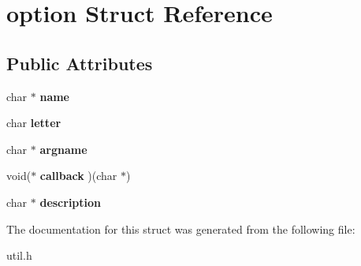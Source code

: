 \hypertarget{structoption}{\section{option Struct Reference}
\label{structoption}
}
\subsection*{Public Attributes}
\begin{DoxyCompactItemize}
\item 
\hypertarget{structoption_a92c850a23c7828c1dba453bf8d15e1f0}{char $\ast$ {\bfseries name}}\label{structoption_a92c850a23c7828c1dba453bf8d15e1f0}

\item 
\hypertarget{structoption_a27b8e131fd56fbd4af053ca4692bedfe}{char {\bfseries letter}}\label{structoption_a27b8e131fd56fbd4af053ca4692bedfe}

\item 
\hypertarget{structoption_ab0a1bafa951008959d848d917a709f06}{char $\ast$ {\bfseries argname}}\label{structoption_ab0a1bafa951008959d848d917a709f06}

\item 
\hypertarget{structoption_a7c54cd6e10438ef77f481826160e41d8}{void($\ast$ {\bfseries callback} )(char $\ast$)}\label{structoption_a7c54cd6e10438ef77f481826160e41d8}

\item 
\hypertarget{structoption_a957577e49cd153ae34d79d57662436da}{char $\ast$ {\bfseries description}}\label{structoption_a957577e49cd153ae34d79d57662436da}

\end{DoxyCompactItemize}


The documentation for this struct was generated from the following file\-:\begin{DoxyCompactItemize}
\item 
util.\-h\end{DoxyCompactItemize}
